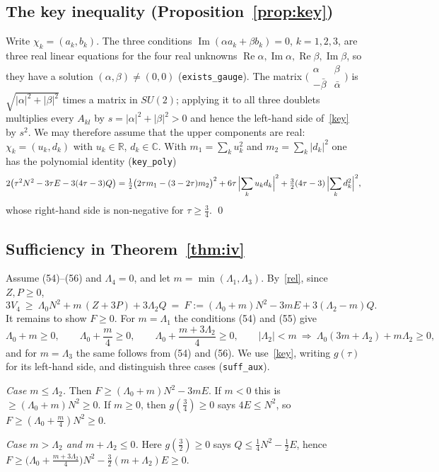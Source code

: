 \documentclass[11pt,a4paper]{amsart}
\theoremstyle{remark}
\newcommand{\R}{\mathbb{R}}
\newcommand{\C}{\mathbb{C}}
\newcommand{\La}{\Lambda}
\newcommand{\lean}[1]{\texttt{#1}}
\renewcommand{\Re}{\operatorname{Re}}
\renewcommand{\Im}{\operatorname{Im}}
\begin{document}
\subsection{The key inequality (Proposition~\ref{prop:key})}
Write $\chi_k=(a_k,b_k)$. The three conditions $\Im(\alpha a_k+\beta b_k)=0$, $k=1,2,3$, are three real linear
equations for the four real unknowns $\Re\alpha,\Im\alpha,\Re\beta,\Im\beta$, so they have a solution
$(\alpha,\beta)\neq(0,0)$ (\lean{exists\_gauge}). The matrix
$\bigl(\begin{smallmatrix}\alpha&\beta\\-\bar\beta&\bar\alpha\end{smallmatrix}\bigr)$ is
$\sqrt{|\alpha|^2+|\beta|^2}$ times a matrix in $SU(2)$; applying it to all three doublets multiplies every
$A_{kl}$ by $s=|\alpha|^2+|\beta|^2>0$ and hence the left-hand side of~\eqref{key} by $s^2$. We may therefore
assume that the upper components are real: $\chi_k=(u_k,d_k)$ with $u_k\in\R$, $d_k\in\C$. With
$m_1=\sum_ku_k^2$ and $m_2=\sum_k|d_k|^2$ one has the polynomial identity (\lean{key\_poly})
\[
2\bigl(\tau^2N^2-3\tau E-3(4\tau-3)Q\bigr)
=\tfrac12\bigl(2\tau m_1-(3-2\tau)m_2\bigr)^2+6\tau\,\Bigl|\sum_ku_kd_k\Bigr|^2
+\tfrac32(4\tau-3)\,\Bigl|\sum_kd_k^2\Bigr|^2 ,
\]
whose right-hand side is non-negative for $\tau\ge\frac34$. \qed

\subsection{Sufficiency in Theorem~\ref{thm:iv}}
Assume (54)--(56) and $\La_4=0$, and let $m=\min(\La_1,\La_3)$. By~\eqref{rel}, since $Z,P\ge0$,
\[
3V_4\ \ge\ \La_0N^2+m\,(Z+3P)+3\La_2Q\ =\ F:=(\La_0+m)N^2-3mE+3(\La_2-m)Q .
\]
It remains to show $F\ge0$. For $m=\La_1$ the conditions (54) and (55) give
\begin{equation}\label{hyp}
\La_0+m\ge0,\qquad \La_0+\frac m4\ge0,\qquad \La_0+\frac{m+3\La_2}{4}\ge0,\qquad
|\La_2|<m\ \Rightarrow\ \La_0(3m+\La_2)+m\La_2\ge0,
\end{equation}
and for $m=\La_3$ the same follows from (54) and (56). We use~\eqref{key}, writing $g(\tau)$ for its left-hand
side, and distinguish three cases (\lean{suff\_aux}).

\emph{Case $m\le\La_2$.} Then $F\ge(\La_0+m)N^2-3mE$. If $m<0$ this is $\ge(\La_0+m)N^2\ge0$. If $m\ge0$,
then $g(\frac34)\ge0$ says $4E\le N^2$, so $F\ge(\La_0+\frac m4)N^2\ge0$.

\emph{Case $m>\La_2$ and $m+\La_2\le0$.} Here $g(\frac32)\ge0$ says $Q\le\frac14N^2-\frac12E$, hence
$F\ge\bigl(\La_0+\frac{m+3\La_2}{4}\bigr)N^2-\frac32(m+\La_2)E\ge0$.
\end{document}

